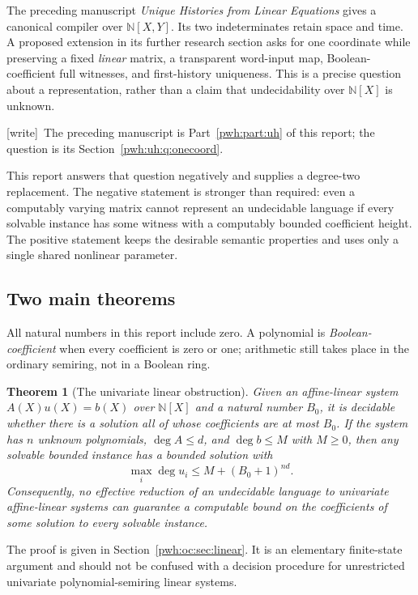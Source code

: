 \documentclass[11pt,letterpaper]{article}
\numberwithin{equation}{section}
\newtheorem{theorem}{Theorem}[section]
\theoremstyle{definition}
\newcommand{\N}{\mathbb N}
\newcommand{\wtag}{\textup{[write]}}
\begin{document}
The preceding manuscript \emph{Unique Histories from Linear Equations}
\cite{oc:Precursor} gives a canonical compiler over $\N[X,Y]$. Its two
indeterminates retain space and time. A proposed extension in its further
research section asks for one coordinate while preserving a fixed
\emph{linear} matrix, a transparent word-input map, Boolean-coefficient full
witnesses, and first-history uniqueness. This is a precise question about a
representation, rather than a claim that undecidability over $\N[X]$ is
unknown.

\wtag\ The preceding manuscript is Part~\ref{pwh:part:uh} of this report;
the question is its Section~\ref{pwh:uh:q:onecoord}.

This report answers that question negatively and supplies a degree-two
replacement. The negative statement is stronger than required: even a
computably varying matrix cannot represent an undecidable language if every
solvable instance has some witness with a computably bounded coefficient
height. The positive statement keeps the desirable semantic properties and
uses only a single shared nonlinear parameter.

\subsection{Two main theorems}

All natural numbers in this report include zero. A polynomial is
\emph{Boolean-coefficient} when every coefficient is zero or one; arithmetic
still takes place in the ordinary semiring, not in a Boolean ring.

\begin{theorem}[The univariate linear obstruction]
\label{pwh:oc:thm:obstruction-intro}
Given an affine-linear system $A(X)u(X)=b(X)$ over $\N[X]$ and a natural
number $B_0$, it is decidable whether there is a solution all of whose
coefficients are at most $B_0$. If the system has $n$ unknown polynomials,
$\deg A\le d$, and $\deg b\le M$ with $M\ge0$, then any solvable bounded
instance has a bounded solution with
\[
 \max_i\deg u_i\le M+(B_0+1)^{nd}.
\]
Consequently, no effective reduction of an undecidable language to
univariate affine-linear systems can guarantee a computable bound on the
coefficients of some solution to every solvable instance.
\end{theorem}

The proof is given in Section~\ref{pwh:oc:sec:linear}. It is an elementary
finite-state argument and should not be confused with a decision procedure
for unrestricted univariate polynomial-semiring linear systems.
\end{document}
